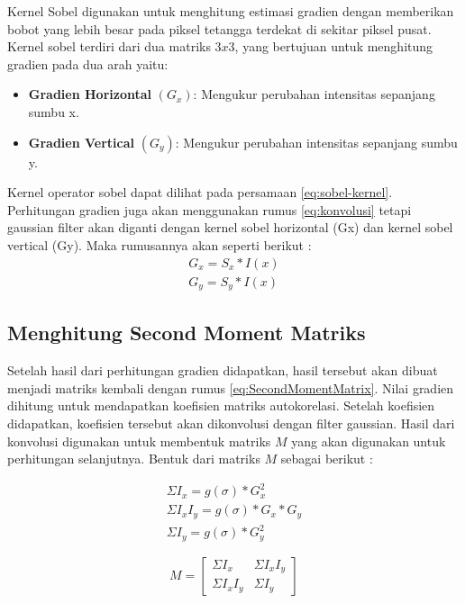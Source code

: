     Kernel Sobel digunakan untuk menghitung estimasi gradien dengan memberikan bobot yang lebih besar pada piksel tetangga terdekat di sekitar piksel pusat.
Kernel sobel terdiri dari dua matriks \(3 x 3\), yang bertujuan untuk menghitung gradien pada dua arah yaitu:
 \begin{itemize}
    \item \textbf{Gradien Horizontal} \((G_{x})\): Mengukur perubahan intensitas sepanjang sumbu x.
    \item \textbf{Gradien Vertical} \((G_{y})\): Mengukur perubahan intensitas sepanjang sumbu y.
\end{itemize}Kernel operator sobel dapat dilihat pada persamaan \eqref{eq:sobel-kernel}. 
Perhitungan gradien juga akan menggunakan rumus \eqref{eq:konvolusi} tetapi gaussian filter akan diganti dengan kernel sobel horizontal (Gx) dan kernel sobel vertical (Gy).
Maka rumusannya akan seperti berikut :
\begin{equation}
    \begin{aligned}
        G_{x} = S_{x} * I(x)\\ G_{y} = S_{y} * I(x)
    \end{aligned}
\end{equation}


\subsection{Menghitung Second Moment Matriks}
    Setelah hasil dari perhitungan gradien didapatkan, hasil tersebut akan dibuat menjadi matriks kembali dengan rumus \eqref{eq:SecondMomentMatrix}. Nilai gradien dihitung untuk mendapatkan koefisien matriks autokorelasi. Setelah koefisien didapatkan, koefisien tersebut akan dikonvolusi dengan filter gaussian.
Hasil dari konvolusi digunakan untuk membentuk matriks \(M\) yang akan digunakan untuk perhitungan selanjutnya. Bentuk dari matriks \(M\) sebagai berikut :

\begin{equation*}
    \begin{aligned}
        \Sigma I_{x} = g(\sigma) * G_{x}^2 \\
        \Sigma I_{x}I_{y} = g(\sigma) * G_{x} * G_{y} \\
        \Sigma I_{y} = g(\sigma) * G_{y}^2
    \end{aligned}
\end{equation*}

\begin{equation}
    M = 
    \begin{bmatrix}
        \Sigma I_{x} & \Sigma I_{x}I_{y} \\
        \Sigma I_{x}I_{y} & \Sigma I_{y}
    \end{bmatrix} 
\end{equation}

